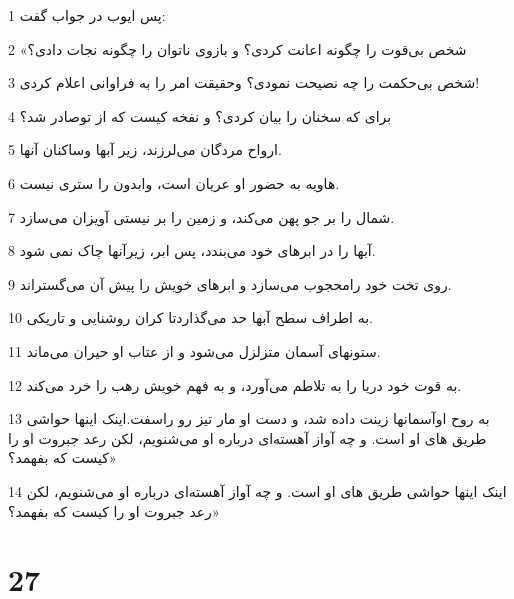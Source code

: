\par 1 پس ایوب در جواب گفت:
\par 2 «شخص بی‌قوت را چگونه اعانت کردی؟ و بازوی ناتوان را چگونه نجات دادی؟
\par 3 شخص بی‌حکمت را چه نصیحت نمودی؟ وحقیقت امر را به فراوانی اعلام کردی!
\par 4 برای که سخنان را بیان کردی؟ و نفخه کیست که از توصادر شد؟
\par 5 ارواح مردگان می‌لرزند، زیر آبها وساکنان آنها.
\par 6 هاویه به حضور او عریان است، وابدون را ستری نیست.
\par 7 شمال را بر جو پهن می‌کند، و زمین را بر نیستی آویزان می‌سازد.
\par 8 آبها را در ابرهای خود می‌بندد، پس ابر، زیرآنها چاک نمی شود.
\par 9 روی تخت خود رامحجوب می‌سازد و ابرهای خویش را پیش آن می‌گستراند.
\par 10 به اطراف سطح آبها حد می‌گذاردتا کران روشنایی و تاریکی.
\par 11 ستونهای آسمان متزلزل می‌شود و از عتاب او حیران می‌ماند.
\par 12 به قوت خود دریا را به تلاطم می‌آورد، و به فهم خویش رهب را خرد می‌کند.
\par 13 به روح اوآسمانها زینت داده شد، و دست او مار تیز رو راسفت.اینک اینها حواشی طریق های او است. و چه آواز آهسته‌ای درباره او می‌شنویم، لکن رعد جبروت او را کیست که بفهمد؟»
\par 14 اینک اینها حواشی طریق های او است. و چه آواز آهسته‌ای درباره او می‌شنویم، لکن رعد جبروت او را کیست که بفهمد؟»
 
\chapter{27}

